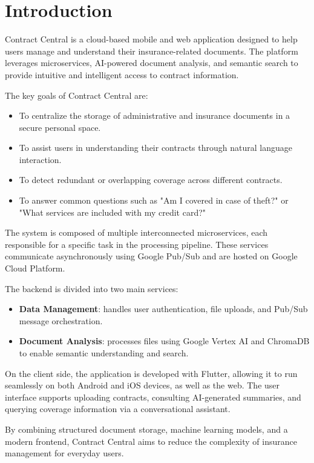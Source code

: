 \chapter{Introduction}
\begingroup
\setlength{\parindent}{0pt}
\setlength{\parskip}{0.5em}

Contract Central is a cloud-based mobile and web application designed to help users manage and understand their insurance-related documents. The platform leverages microservices, AI-powered document analysis, and semantic search to provide intuitive and intelligent access to contract information.

The key goals of Contract Central are:
\begin{itemize}
    \item To centralize the storage of administrative and insurance documents in a secure personal space.
    \item To assist users in understanding their contracts through natural language interaction.
    \item To detect redundant or overlapping coverage across different contracts.
    \item To answer common questions such as "Am I covered in case of theft?" or "What services are included with my credit card?"
\end{itemize}

The system is composed of multiple interconnected microservices, each responsible for a specific task in the processing pipeline. These services communicate asynchronously using Google Pub/Sub and are hosted on Google Cloud Platform.

The backend is divided into two main services:
\begin{itemize}
    \item \textbf{Data Management}: handles user authentication, file uploads, and Pub/Sub message orchestration.
    \item \textbf{Document Analysis}: processes files using Google Vertex AI and ChromaDB to enable semantic understanding and search.
\end{itemize}

On the client side, the application is developed with Flutter, allowing it to run seamlessly on both Android and iOS devices, as well as the web. The user interface supports uploading contracts, consulting AI-generated summaries, and querying coverage information via a conversational assistant.

By combining structured document storage, machine learning models, and a modern frontend, Contract Central aims to reduce the complexity of insurance management for everyday users.
\endgroup